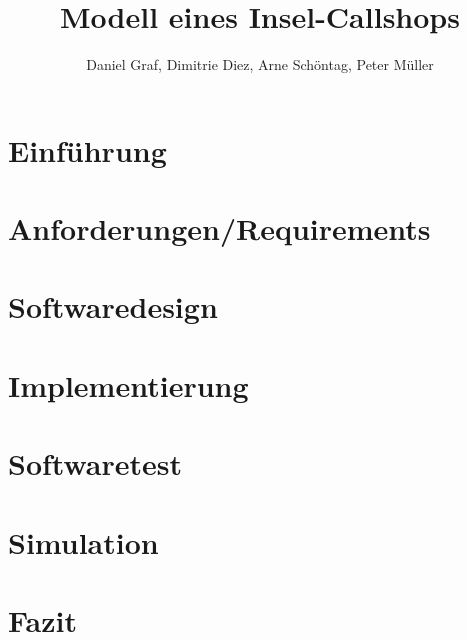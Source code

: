 

\title{Modell eines Insel-Callshops}
\providecommand{\subtitle}[1]{}
\subtitle{2. Projekt zu Modellierung und Simulation}
\author{Daniel Graf, Dimitrie Diez, Arne Schöntag, Peter Müller}
\date{}



\maketitle

\tableofcontents

\section{Einführung}

\section{Anforderungen/Requirements}

\section{Softwaredesign}

\section{Implementierung}

\section{Softwaretest}

\section{Simulation}

\section{Fazit}


